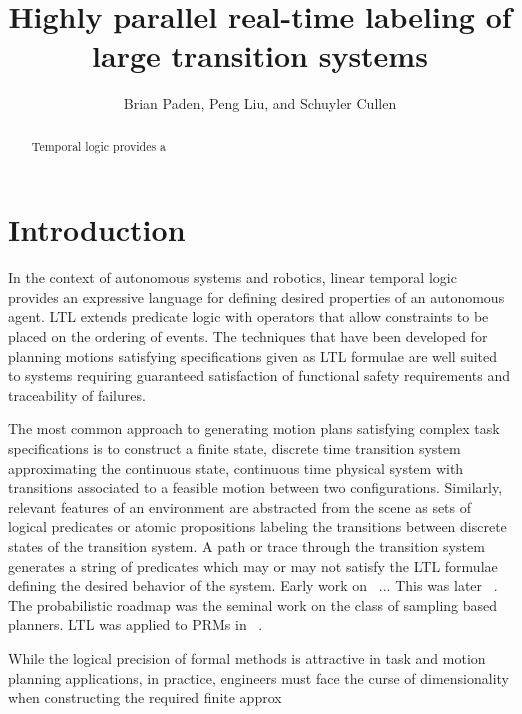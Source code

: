 \documentclass{llncs}
\begin{document}
\title{Highly parallel real-time labeling of large transition systems}

\author{Brian Paden, Peng Liu, and Schuyler Cullen}
\maketitle
\begin{abstract}
%
Temporal logic provides a 
\end{abstract}
%

\section{Introduction}
In the context of autonomous systems and robotics, linear temporal logic provides an expressive language for defining desired properties of an autonomous agent. 
%
LTL extends predicate logic with operators that allow constraints to be placed on the ordering of events. 
%
The techniques that have been developed for planning motions satisfying specifications given as LTL formulae are well suited to systems requiring guaranteed satisfaction of functional safety requirements and traceability of failures.
%

The most common approach to generating motion plans satisfying complex task specifications is to construct a finite state, discrete time transition system approximating the continuous state, continuous time physical system with transitions associated to a feasible motion between two configurations. 
%
Similarly, relevant features of an environment are abstracted from the scene as sets of logical predicates or atomic propositions labeling the transitions between discrete states of the transition system.
%
A path or trace through the transition system generates a string of predicates which may or may not satisfy the LTL formulae defining the desired behavior of the system.
%
Early work on ~\cite{fainekos2005temporal}... This was later ~\cite{kress2009temporal}. The probabilistic roadmap was the seminal work on the class of sampling based planners. LTL was applied to PRMs in ~\cite{plaku2012path}.


While the logical precision of formal methods is attractive in task and motion planning applications, in practice, engineers must face the curse of dimensionality when constructing the required finite approx
\end{document}
